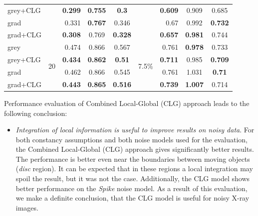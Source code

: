 \begin{table}[ht]
\begin{tabular}{rrrrrrrrr}
    \multicolumn{1}{l}{grey+CLG} &       & \textbf{0.299} & \multicolumn{1}{c}{\textbf{0.755}} & \multicolumn{1}{c}{\textbf{0.3}} &       & \textbf{0.609} & \multicolumn{1}{c}{0.909} & \multicolumn{1}{c}{0.685} \\
    \multicolumn{1}{l}{grad} &       & 0.331 & \multicolumn{1}{c}{\textbf{0.767}} & \multicolumn{1}{c}{0.346} &       & 0.67  & \multicolumn{1}{c}{0.992} & \multicolumn{1}{c}{\textbf{0.732}} \\
    \multicolumn{1}{l}{grad+CLG} &       & \textbf{0.308} & \multicolumn{1}{c}{0.769} & \multicolumn{1}{c}{\textbf{0.328}} &       & \textbf{0.657} & \multicolumn{1}{c}{\textbf{0.981}} & \multicolumn{1}{c}{0.744} \\
    \midrule
    \multicolumn{1}{l}{grey} & \multicolumn{1}{c}{\multirow{4}[0]{*}{20}} & 0.474 & \multicolumn{1}{c}{0.866} & \multicolumn{1}{c}{0.567} & \multicolumn{1}{c}{\multirow{4}[0]{*}{7.5\%}} & 0.761 & \multicolumn{1}{c}{\textbf{0.978}} & \multicolumn{1}{c}{0.733} \\
    \multicolumn{1}{l}{grey+CLG} &       & \textbf{0.434} & \multicolumn{1}{c}{\textbf{0.862}} & \multicolumn{1}{c}{\textbf{0.51}} &       & \textbf{0.711} & \multicolumn{1}{c}{0.985} & \multicolumn{1}{c}{\textbf{0.709}} \\
    \multicolumn{1}{l}{grad} &       & 0.462 & \multicolumn{1}{c}{0.866} & \multicolumn{1}{c}{0.545} &       & 0.761 & \multicolumn{1}{c}{1.031} & \multicolumn{1}{c}{\textbf{0.71}} \\
    \multicolumn{1}{l}{grad+CLG} &       & \textbf{0.443} & \multicolumn{1}{c}{\textbf{0.865}} & \multicolumn{1}{c}{\textbf{0.516}} &       & \textbf{0.739} & \multicolumn{1}{c}{\textbf{1.007}} & \multicolumn{1}{c}{0.714} \\
    \bottomrule

    \end{tabular}%
  \label{tab:exp_clg}%
\end{table}%


Performance evaluation of Combined Local-Global (CLG) approach leads to the following conclusion:
\begin{itemize}
	\item \textit{Integration of local information is useful to improve results on noisy data}. For both constancy assumptions and both noise models used for the evaluation, the Combined Local-Global (CLG) approach gives significantly better results. The performance is better even near the boundaries between moving objects (\textit{disc} region). It can be expected  that in these regions a local integration may spoil the result, but it was not the case. Additionally, the CLG model shows better performance on the \textit{Spike} noise model. As a result of this evaluation,  we make a definite conclusion, that the CLG model is useful for noisy X-ray images.     
\end{itemize}


